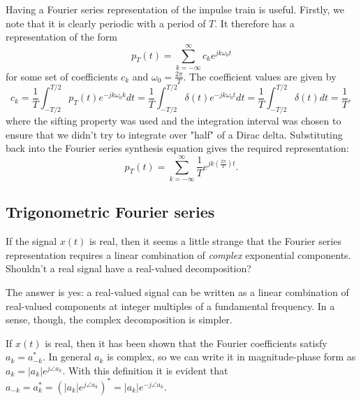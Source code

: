 \documentclass[10pt]{beamer}
\begin{document}
Having a Fourier series representation of the impulse train is useful.  Firstly, we note that it is clearly periodic with a period of $T$.  It therefore has a representation of the form
\begin{equation*}
  p_T(t) = \sum_{k=-\infty}^{\infty} c_k e^{j k \omega_0 t}
\end{equation*}
for some set of coefficients $c_k$ and $\omega_0 = \frac{2 \pi}{T}$.  The coefficient values are given by
\begin{equation*}
  c_k = \frac{1}{T} \int_{-T/2}^{T/2} p_T(t) e^{-j k \omega_0 k} dt = \frac{1}{T} \int_{-T/2}^{T/2} \delta(t) e^{-j k \omega_0 t} dt
  = \frac{1}{T} \int_{-T/2}^{T/2} \delta(t) dt = \frac{1}{T},
\end{equation*}
where the sifting property was used and the integration interval was chosen to ensure that we didn't try to integrate over "half" of a Dirac delta.  Substituting back into the Fourier series synthesis equation gives the required representation:
\begin{equation*}
  p_T(t) = \sum_{k=-\infty}^{\infty} \frac{1}{T} e^{j k \left( \frac{2 \pi}{T} \right) t}.
\end{equation*}

\subsection{Trigonometric Fourier series}

If the signal $x(t)$ is real, then it seems a little strange that the Fourier series representation requires a linear combination of {\em complex} exponential components.  Shouldn't a real signal have a real-valued decomposition?

The answer is yes:  a real-valued signal can be written as a linear combination of real-valued components at integer multiples of a fundamental frequency.  In a sense, though, the complex decomposition is simpler. 

If $x(t)$ is real, then it has been shown that the Fourier coefficients satisfy $a_{k} = a_{-k}^\ast$.  In general $a_k$ is complex, so we can write it in magnitude-phase form as $a_k = |a_k|e^{j \angle a_k}$.  With this definition it is evident that $a_{-k} = a_k^\ast = (|a_k| e^{j \angle a_k})^\ast = |a_k| e^{-j \angle a_k}$.
\end{document}
